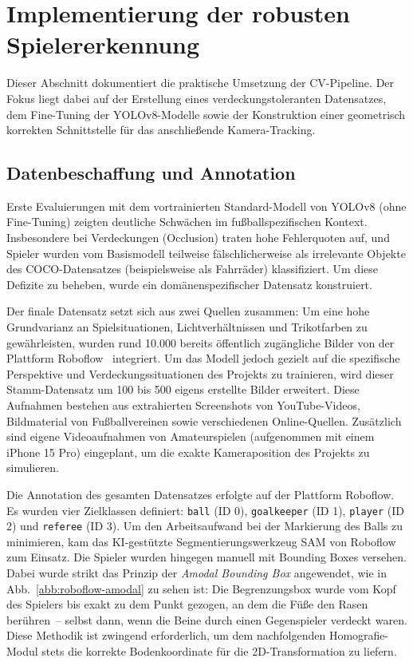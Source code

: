 \section{Implementierung der robusten Spielererkennung}

Dieser Abschnitt dokumentiert die praktische Umsetzung der \ac{CV}-Pipeline. Der Fokus liegt dabei auf der 
Erstellung eines verdeckungstoleranten Datensatzes, dem Fine-Tuning der YOLOv8-Modelle sowie der 
Konstruktion einer geometrisch korrekten Schnittstelle für das anschließende Kamera-Tracking.

\subsection{Datenbeschaffung und Annotation}

Erste Evaluierungen mit dem vortrainierten Standard-Modell von YOLOv8 (ohne Fine-Tuning) zeigten deutliche 
Schwächen im fußballspezifischen Kontext. Insbesondere bei Verdeckungen (Occlusion) traten hohe 
Fehlerquoten auf, und Spieler wurden vom Basismodell teilweise fälschlicherweise als irrelevante Objekte 
des \ac{COCO}-Datensatzes (beispielsweise als Fahrräder) klassifiziert. Um diese Defizite zu beheben, 
wurde ein domänenspezifischer Datensatz konstruiert.

Der finale Datensatz setzt sich aus zwei Quellen zusammen: Um eine hohe Grundvarianz an Spielsituationen, 
Lichtverhältnissen und Trikotfarben zu gewährleisten, wurden rund 10.000 bereits öffentlich zugängliche 
Bilder von der Plattform Roboflow~\cite{roboflow2024} integriert. Um das Modell jedoch gezielt auf die 
spezifische Perspektive und Verdeckungssituationen des Projekts zu trainieren, wird dieser Stamm-Datensatz 
um 100 bis 500 eigens erstellte Bilder erweitert. Diese Aufnahmen bestehen aus extrahierten Screenshots 
von YouTube-Videos, Bildmaterial von Fußballvereinen sowie verschiedenen Online-Quellen. Zusätzlich sind 
eigene Videoaufnahmen von Amateurspielen (aufgenommen mit einem iPhone 15 Pro) eingeplant, um die exakte 
Kameraposition des Projekts zu simulieren.

Die Annotation des gesamten Datensatzes erfolgte auf der Plattform Roboflow. Es wurden vier Zielklassen 
definiert: \texttt{ball} (ID 0), \texttt{goalkeeper} (ID 1), \texttt{player} (ID 2) und \texttt{referee} (ID 3).
 Um den Arbeitsaufwand bei der Markierung des Balls zu minimieren, kam das KI-gestützte 
 Segmentierungswerkzeug \ac{SAM} von Roboflow zum Einsatz. Die Spieler wurden hingegen manuell 
 mit Bounding Boxes versehen. Dabei wurde strikt das Prinzip der \textit{Amodal Bounding Box} 
 angewendet, wie in Abb.~\ref{abb:roboflow-amodal} zu sehen ist: Die Begrenzungsbox wurde vom Kopf 
 des Spielers bis exakt zu dem Punkt gezogen, an dem die Füße den Rasen berühren~-- selbst dann, wenn 
 die Beine durch einen Gegenspieler verdeckt waren. Diese Methodik ist zwingend erforderlich, um dem 
 nachfolgenden Homografie-Modul stets die korrekte Bodenkoordinate für die 2D-Transformation zu liefern.

